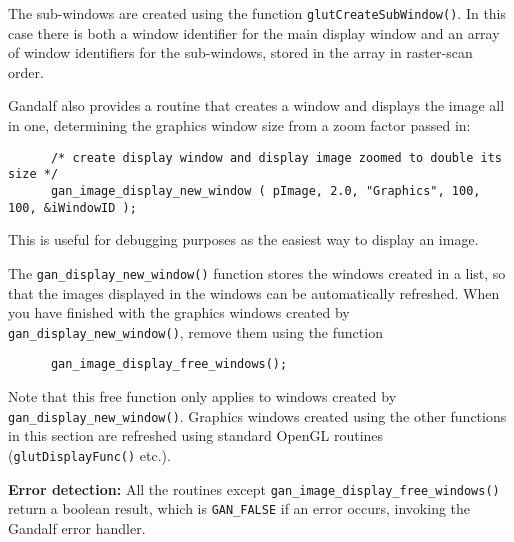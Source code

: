 The sub-windows are created using the function {\tt glutCreateSubWindow()}.
In this case there is both a window identifier for the main display window
and an array of window identifiers for the sub-windows, stored in the
array in raster-scan order.

Gandalf also provides a routine that creates a window and displays the
image all in one, determining the graphics window size from a zoom factor
passed in:
\begin{verbatim}
      /* create display window and display image zoomed to double its size */
      gan_image_display_new_window ( pImage, 2.0, "Graphics", 100, 100, &iWindowID );
\end{verbatim}
This is useful for debugging purposes as the easiest way to display an image.

The {\tt gan\_display\_new\_window()} function stores the windows
created in a list, so that the images displayed in the windows can be
automatically refreshed. When you have finished with the graphics windows
created by {\tt gan\_display\_new\_window()}, remove them using
the function
\begin{verbatim}
      gan_image_display_free_windows();
\end{verbatim}
Note that this free function only applies to windows created by
{\tt gan\_display\_new\_window()}. Graphics windows created using
the other functions in this section are refreshed using standard
OpenGL routines ({\tt glutDisplayFunc()} etc.).

{\bf Error detection:} All the routines except
{\tt gan\_image\_display\_free\_windows()} return a boolean result,
which is {\tt GAN\_FALSE} if an error occurs, invoking the Gandalf
error handler.

